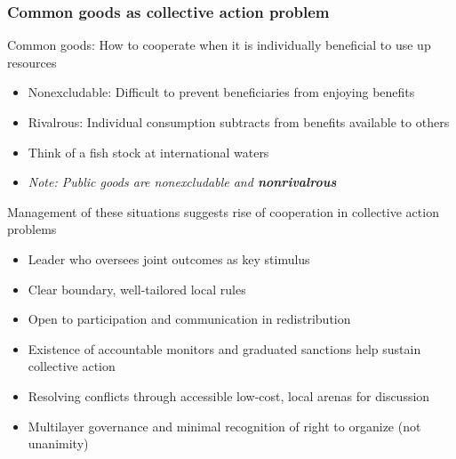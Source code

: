 \documentclass[aspectratio=169]{beamer}
\begin{document}
\begin{frame}
\frametitle{Common goods as collective action problem}
Common goods: How to cooperate when it is individually beneficial to use up resources
\begin{itemize}\setlength\itemsep{3pt}
  \item Nonexcludable: Difficult to prevent beneficiaries from enjoying benefits
  \item Rivalrous: Individual consumption subtracts from benefits available to others
  \item Think of a fish stock at international waters
  \item \textit{Note: Public goods are nonexcludable and \textbf{nonrivalrous}}
\end{itemize} \medskip
Management of these situations suggests rise of cooperation in collective action problems
\begin{itemize}\setlength\itemsep{3pt}
  \item Leader who oversees joint outcomes as key stimulus
  \item Clear boundary, well-tailored local rules

  \item Open to participation and communication in redistribution

\item Existence of accountable monitors and graduated sanctions help sustain collective action
\item Resolving conflicts through accessible low-cost, local arenas for discussion
\item Multilayer governance and minimal recognition of right to organize (not unanimity)
\end{itemize}
\end{frame}
\end{document}
